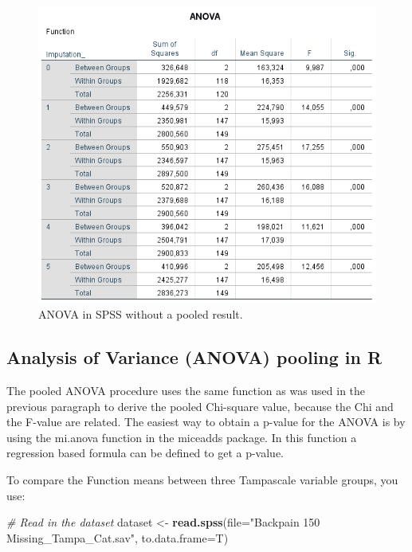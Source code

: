 \documentclass[]{book}
\newenvironment{Shaded}{\begin{snugshade}}{\end{snugshade}}
\newcommand{\KeywordTok}[1]{\textcolor[rgb]{0.13,0.29,0.53}{\textbf{#1}}}
\newcommand{\DataTypeTok}[1]{\textcolor[rgb]{0.13,0.29,0.53}{#1}}
\newcommand{\StringTok}[1]{\textcolor[rgb]{0.31,0.60,0.02}{#1}}
\newcommand{\CommentTok}[1]{\textcolor[rgb]{0.56,0.35,0.01}{\textit{#1}}}
\newcommand{\NormalTok}[1]{#1}
\begin{document}
\begin{figure}

{\centering \includegraphics[width=0.9\linewidth]{images/table5.7} 

}

\caption{ANOVA in SPSS without a pooled result.}\label{fig:tab5-7}
\end{figure}

\subsection{Analysis of Variance (ANOVA) pooling in
R}\label{analysis-of-variance-anova-pooling-in-r}

The pooled ANOVA procedure uses the same function as was used in the
previous paragraph to derive the pooled Chi-square value, because the
Chi and the F-value are related. The easiest way to obtain a p-value for
the ANOVA is by using the mi.anova function in the miceadds package. In
this function a regression based formula can be defined to get a
p-value.

To compare the Function means between three Tampascale variable groups,
you use:

\begin{Shaded}
\begin{Highlighting}[]
\CommentTok{# Read in the dataset}
\NormalTok{dataset <-}\StringTok{ }\KeywordTok{read.spss}\NormalTok{(}\DataTypeTok{file=}\StringTok{"Backpain 150 Missing_Tampa_Cat.sav"}\NormalTok{, }\DataTypeTok{to.data.frame=}\NormalTok{T)}
\end{Highlighting}
\end{Shaded}
\end{document}
